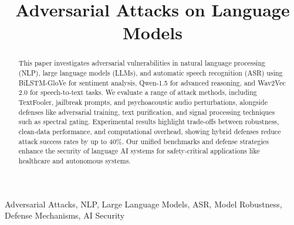 \documentclass[conference]{IEEEtran}
\begin{document}
\title{Adversarial Attacks on Language Models}

\maketitle

\begin{abstract}
This paper investigates adversarial vulnerabilities in natural language processing (NLP), large language models (LLMs), and automatic speech recognition (ASR) using BiLSTM-GloVe for sentiment analysis, Qwen-1.5 for advanced reasoning, and Wav2Vec 2.0 for speech-to-text tasks. We evaluate a range of attack methods, including TextFooler, jailbreak prompts, and psychoacoustic audio perturbations, alongside defenses like adversarial training, text purification, and signal processing techniques such as spectral gating. Experimental results highlight trade-offs between robustness, clean-data performance, and computational overhead, showing hybrid defenses reduce attack success rates by up to 40\%. Our unified benchmarks and defense strategies enhance the security of language AI systems for safety-critical applications like healthcare and autonomous systems.
\end{abstract}

\begin{IEEEkeywords}
Adversarial Attacks, NLP, Large Language Models, ASR, Model Robustness, Defense Mechanisms, AI Security
\end{IEEEkeywords}
\end{document}
